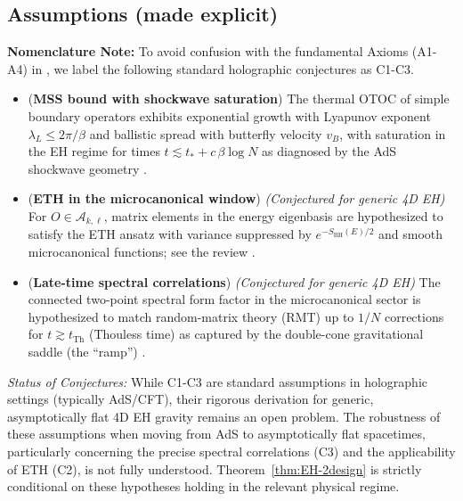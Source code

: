 \documentclass[a4paper,11pt]{article}
\theoremstyle{plain}
\theoremstyle{definition}
\theoremstyle{remark}
\begin{document}
\subsection*{Assumptions (made explicit)}
\textbf{Nomenclature Note:} To avoid confusion with the fundamental Axioms (A1-A4) in , we label the following standard holographic conjectures as C1-C3.
\begin{itemize}[leftmargin=*]
  \item[C1.] ({\bf MSS bound with shockwave saturation}) The thermal OTOC of simple boundary operators exhibits exponential growth with Lyapunov exponent $\lambda_L\le 2\pi/\beta$ and ballistic spread with butterfly velocity $v_B$, with saturation in the EH regime for times $t\lesssim t_\ast+c\,\beta\log N$ as diagnosed by the AdS shockwave geometry \cite{MaldacenaShenkerStanford2016,ShenkerStanford2014}.
  \item[C2.] ({\bf ETH in the microcanonical window}) \textit{(Conjectured for generic 4D EH)} For $O\in \mathscr{A}_{k,\ell}$, matrix elements in the energy eigenbasis are hypothesized to satisfy the ETH ansatz with variance suppressed by $e^{-S_{\mathrm{BH}}(E)/2}$ and smooth microcanonical functions; see the review \cite{DAlessioKafriPolkovnikovRigol2016}.
  \item[C3.] ({\bf Late-time spectral correlations}) \textit{(Conjectured for generic 4D EH)} The connected two-point spectral form factor in the microcanonical sector is hypothesized to match random-matrix theory (RMT) up to $1/N$ corrections for $t\gtrsim t_{\mathrm{Th}}$ (Thouless time) as captured by the double-cone gravitational saddle (the ``ramp'') \cite{SaadShenkerStanford2019,CotlerEtAl2017}.
\end{itemize}

\noindent\textit{Status of Conjectures:} While C1-C3 are standard assumptions in holographic settings (typically AdS/CFT), their rigorous derivation for generic, asymptotically flat 4D EH gravity remains an open problem. The robustness of these assumptions when moving from AdS to asymptotically flat spacetimes, particularly concerning the precise spectral correlations (C3) and the applicability of ETH (C2), is not fully understood. Theorem~\ref{thm:EH-2design} is strictly conditional on these hypotheses holding in the relevant physical regime.
\end{document}
